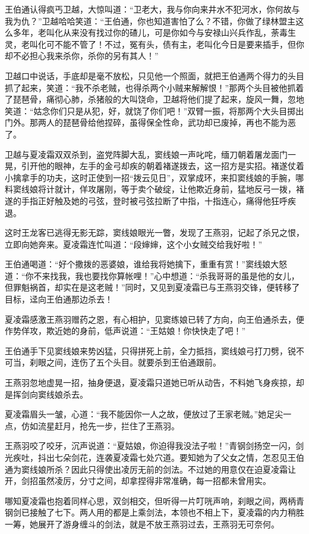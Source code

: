 \documentclass[12pt,oneside]{book}
\begin{document}
王伯通认得疯丐卫越，大惊叫道：``卫老大，我与你向来井水不犯河水，你何故与我为仇？''卫越哈哈笑道：``王伯通，你也知道害怕了么？不错，你做了绿林盟主这么多年，老叫化从来没有找过你的碴儿，可是你如今与安禄山兴兵作乱，荼毒生灵，老叫化可不能不管了！不过，冤有头，债有主，老叫化今日是要来插手，但你却不必担心我来杀你，杀你的另有其人！''

卫越口中说话，手底却是毫不放松，只见他一个照面，就把王伯通两个得力的头目抓了起来，笑道：``我不杀老贼，也得杀两个小贼来解解恨！''那两个头目被他抓着了琵琶骨，痛彻心肺，杀猪般的大叫饶命，卫越将他们提了起来，旋风一舞，忽地笑道：``姑念你们只是从犯，好，就饶了你们吧！''双臂一振，将那两个大头目掷出门外。那两人的琵琶骨给他捏碎，虽得保全性命，武功却已废掉，再也不能为恶了。

卫越与夏凌霜双双杀到，盗党阵脚大乱，窦线娘一声叱咤，缅刀朝着屠龙面门一晃，引开他的眼神，左手的金弓却疾的朝着褚遂拨去，这一招方是实招。褚遂仗着小擒拿手的功夫，这时正使到一招``拨云见日''，双掌成环，来扣窦线娘的手腕，哪料窦线娘将计就计，佯攻屠刚，等于卖个破绽，让他欺近身前，猛地反弓一拨，褚遂的手指正好触及她的弓弦，登时被弓弦拉断了中指，十指连心，痛得他狂呼疾退。

这时王龙客已逃得无影无踪，窦线娘眼光一瞥，发现了王燕羽，记起了杀兄之恨，立即向她奔来。夏凌霜连忙叫道：``段婶婶，这个小女贼交给我好啦！''

王伯通喝道：``好个撒拨的恶婆娘，谁给我将她擒下，重重有赏！''窦线娘大怒道：``你不来找我，我也要找你算帐哩！''心中想道：``杀我哥哥的虽是他的女儿，但罪魁祸首，却实在是这老贼！''同时，又见到夏凌霜已与王燕羽交锋，便转移了目标，迳向王伯通那边杀去！

夏凌霜感激王燕羽赠药之恩，有心相护，见窦练娘已转了方向，向王伯通杀去，便作势佯攻，欺近她的身前，低声说道：``王姑娘！你快快走了吧！''

王伯通手下见窦线娘来势凶猛，只得拼死上前，全力抵挡，窦线娘弓打刀劈，锐不可当，刹眼之间，连伤了五个头目。就要杀到王伯通跟前。

王燕羽忽地虚晃一招，抽身便退，夏凌霜只道她已听从动告，不料她飞身疾掠，却是挥剑向窦线娘杀去。

夏凌霜眉头一皱，心道：``我不能因你一人之故，便放过了王家老贼。''她足尖一点，仿如流星赶月，抢先一步，拦住了王燕羽。

王燕羽咬了咬牙，沉声说道：``夏姑娘，你迫得我没法子啦！''青钢剑扬空一闪，剑光疾吐，抖出七朵剑花，连袭夏凌霜七处穴道。要知她为了父女之情，怎忍见王伯通为窦线娘所杀？因此只得使出凌厉无前的剑法。不过她的用意仅在迫夏凌霜让开，剑招虽然凌厉，分寸之间，却拿捏得非常准确，每一招都未曾用实。

哪知夏凌霜也抱着同样心思，双剑相交，但听得一片叮咣声响，刹眼之间，两柄青钢剑已接触了七下。两人用的都是上乘剑法，本领也不相上下，夏凌霜的内力稍胜一筹，她展开了游身缠斗的剑法，就是不放王燕羽过去，王燕羽无可奈何。
\end{document}
